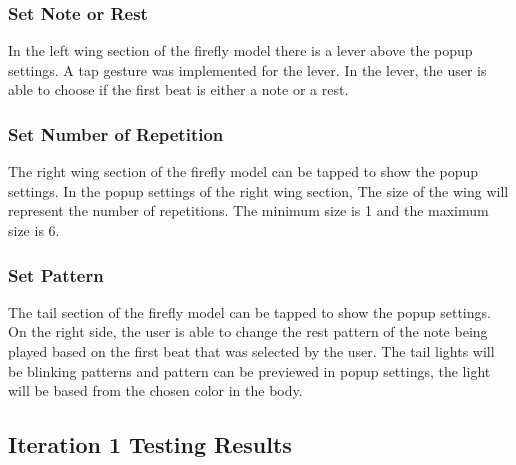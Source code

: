 \subsubsection{Set Note or Rest}
In the left wing section of the firefly model there is a lever above the popup settings. A tap gesture was implemented for the lever. In the lever, the user is able to choose if the first beat is either a note or a rest.

\subsubsection{Set Number of Repetition}
The right wing section of the firefly model can be tapped to show the popup settings. In the popup settings of the right wing section, The size of the wing will represent the number of repetitions. The minimum size is 1 and the maximum size is 6.

\subsubsection{Set Pattern}
The tail section of the firefly model can be tapped to show the popup settings. On the right side, the user is able to change the rest pattern of the note being played based on the first beat that was selected by the user. The tail lights will be blinking patterns and pattern can be previewed in popup settings, the light will be based from the chosen color in the body.



\subsection{Iteration 1 Testing Results}


